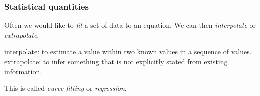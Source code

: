 \documentclass[11pt]{beamer}
\begin{document}
\begin{frame}[fragile]
  \frametitle{Statistical quantities}

  \begin{enumerate}
  \myitem  Often we would like to \emph{fit} a set of data to an equation.  %
  \myitem  We can then \emph{interpolate} or \emph{extrapolate}. 
  	\begin{enumerate}
     	\mysubitem  interpolate: to estimate a value within two known values in a sequence of values.
  		\mysubitem extrapolate: to infer something that is not explicitly stated from existing information. 	
    \end{enumerate}
  \myitem  This is called \emph{curve fitting} or \emph{regression}.
  \end{enumerate}


\end{frame}
\end{document}
